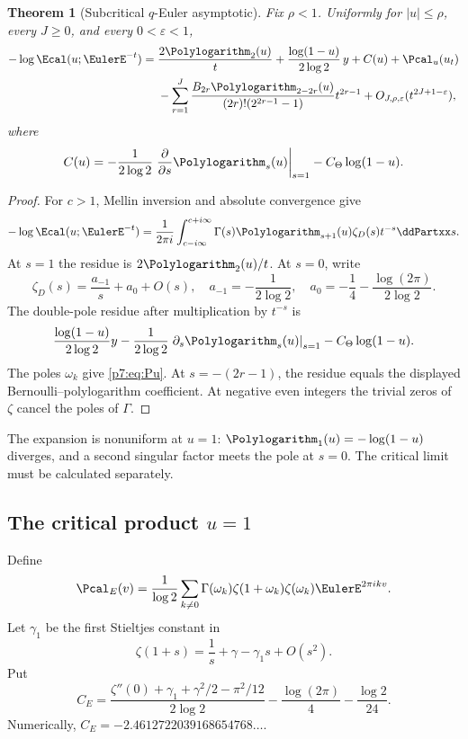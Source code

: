 \documentclass[11pt]{article}
\numberwithin{equation}{section}
\newtheorem{theorem}{Theorem}[section]
\theoremstyle{definition}
\theoremstyle{remark}
\begin{document}
\begin{theorem}[Subcritical $q$-Euler asymptotic]\label{p7:thm:E-subcritical}
Fix $\rho<1$.  Uniformly for $|u|\le\rho$, every $J\ge0$, and every $0<\varepsilon<1$,
\begin{align}\label{p7:eq:E-subcritical-asymp}
 -\log\Ecal(u;\EulerE^{-t})
 ={}&\frac{2\Polylogarithm_2(u)}t
 +\frac{\log(1-u)}{2\log2}\,y
 +C(u)+\Pcal_u(u_t)\\
 &-\sum_{r=1}^{J}
 \frac{B_{2r}\Polylogarithm_{2-2r}(u)}{(2r)!(2^{2r-1}-1)}t^{2r-1}
 +O_{J,\rho,\varepsilon}(t^{2J+1-\varepsilon}),\notag
\end{align}
where
\begin{equation}\label{p7:eq:Cu}
 C(u)=-\frac1{2\log2}
 \left.\frac{\partial}{\partial s}\Polylogarithm_s(u)\right|_{s=1}
 -C_\Theta\log(1-u).
\end{equation}
\end{theorem}

\begin{proof}
For $c>1$, Mellin inversion and absolute convergence give
\begin{equation}\label{p7:eq:E-Mellin}
 -\log\Ecal(u;\EulerE^{-t})
 =\frac1{2\pi i}\int_{c-i\infty}^{c+i\infty}
 \Gamma(s)\Polylogarithm_{s+1}(u)\zeta_D(s)t^{-s}\ddPartxx s.
\end{equation}
At $s=1$ the residue is $2\Polylogarithm_2(u)/t$.  At $s=0$, write
\[
 \zeta_D(s)=\frac{a_{-1}}s+a_0+O(s),
 \quad
 a_{-1}=-\frac1{2\log2},
 \quad
 a_0=-\frac14-\frac{\log(2\pi)}{2\log2}.
\]
The double-pole residue after multiplication by $t^{-s}$ is
\[
 \frac{\log(1-u)}{2\log2}y
 -\frac1{2\log2}\left.\partial_s\Polylogarithm_s(u)\right|_{s=1}
 -C_\Theta\log(1-u).
\]
The poles $\omega_k$ give \cref{p7:eq:Pu}.  At $s=-(2r-1)$, the residue equals the displayed Bernoulli--polylogarithm coefficient.  At negative even integers the trivial zeros of $\zeta$ cancel the poles of $\Gamma$.
\end{proof}

The expansion is nonuniform at $u=1$: $\Polylogarithm_1(u)=-\log(1-u)$ diverges, and a second singular factor meets the pole at $s=0$.  The critical limit must be calculated separately.

\subsection{The critical product $u=1$}

Define
\begin{equation}\label{p7:eq:PE}
 \Pcal_E(v)=\frac1{\log2}
 \sum_{k\ne0}\Gamma(\omega_k)\zeta(1+\omega_k)
 \zeta(\omega_k)\EulerE^{2\pi ikv}.
\end{equation}
Let $\gamma_1$ be the first Stieltjes constant in
\[
 \zeta(1+s)=\frac1s+\gamma-\gamma_1s+O(s^2).
\]
Put
\begin{equation}\label{p7:eq:CE}
 C_E=
 \frac{\zeta''(0)+\gamma_1+\gamma^2/2-\pi^2/12}{2\log2}
 -\frac{\log(2\pi)}4-\frac{\log2}{24}.
\end{equation}
Numerically, $C_E=-2.4612722039168654768\ldots$.
\end{document}
